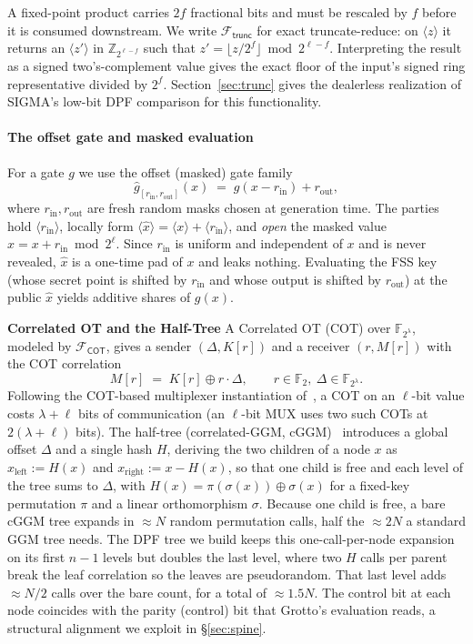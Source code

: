 \documentclass[journal]{IEEEtran}
\theoremstyle{definition}
\theoremstyle{plain}
\newcommand{\F}{\mathbb{F}}
\newcommand{\ashare}[1]{\langle #1 \rangle}             %
\newcommand{\Fcot}{\mathcal{F}_{\mathsf{COT}}}
\newcommand{\Ftr}{\mathcal{F}_{\mathsf{trunc}}}
\newcommand{\xhat}{\hat{x}}
\begin{document}
A fixed-point product carries $2f$ fractional bits and must be rescaled by $f$
before it is consumed downstream. We write $\Ftr$ for exact truncate-reduce:
on $\ashare{z}$ it returns an $\ashare{z'}$ in
$\mathbb Z_{2^{\ell-f}}$ such that
$z'=\lfloor z/2^f\rfloor\bmod 2^{\ell-f}$. Interpreting the result as a signed
two's-complement value gives the exact floor of the input's signed ring
representative divided by $2^f$. Section~\ref{sec:trunc} gives the dealerless
realization of SIGMA's low-bit DPF comparison for this functionality.

\paragraph*{The offset gate and masked evaluation}
\label{sec:offset}
For a gate $g$ we use the offset (masked) gate family
\begin{equation}
\hat g_{[r_{\mathrm{in}},r_{\mathrm{out}}]}(x) \;=\; g\!\left(x - r_{\mathrm{in}}\right) + r_{\mathrm{out}},
\label{eq:offset}
\end{equation}
where $r_{\mathrm{in}},r_{\mathrm{out}}$ are fresh random masks chosen at
generation time. The parties hold $\ashare{r_{\mathrm{in}}}$, locally form
$\ashare{\xhat}=\ashare{x}+\ashare{r_{\mathrm{in}}}$, and \emph{open} the masked
value $\xhat=x+r_{\mathrm{in}}\bmod 2^{\ell}$. Since $r_{\mathrm{in}}$ is uniform
and independent of $x$ and is never revealed, $\xhat$ is a one-time pad of $x$
and leaks nothing. Evaluating the FSS key (whose secret point is shifted by
$r_{\mathrm{in}}$ and whose output is shifted by $r_{\mathrm{out}}$) at the public
$\xhat$ yields additive shares of $g(x)$.


\textbf{Correlated OT and the Half-Tree}
\label{sec:cot}
A Correlated OT (COT) over $\F_{2^{\lambda}}$, modeled by $\Fcot$, gives a sender
$(\Delta, K[r])$ and a receiver $(r, M[r])$ with the COT correlation
\begin{equation}
M[r] \;=\; K[r]\oplus r\cdot\Delta, \qquad r\in\F_2,\ \Delta\in\F_{2^{\lambda}}.
\label{eq:cot}
\end{equation}
Following the COT-based multiplexer instantiation of~\cite{distfss}, a COT on an
$\ell$-bit value costs $\lambda{+}\ell$ bits of communication (an $\ell$-bit MUX
uses two such COTs at $2(\lambda{+}\ell)$ bits).
The half-tree (correlated-GGM, cGGM)~\cite{halftree} introduces a global offset
$\Delta$ and a single hash $H$, deriving the two children of a node $x$ as
$x_{\mathrm{left}}:=H(x)$ and $x_{\mathrm{right}}:=x-H(x)$, so that one child is
free and each level of the tree sums to $\Delta$, with
$H(x)=\pi(\sigma(x))\oplus\sigma(x)$ for a fixed-key permutation $\pi$ and a
linear orthomorphism $\sigma$. Because one child is free, a bare cGGM tree expands
in $\approx N$ random permutation calls, half the $\approx 2N$ a standard GGM tree
needs. The DPF tree we build keeps this one-call-per-node expansion on its first
$n-1$ levels but doubles the last level, where two $H$ calls per parent break the
leaf correlation so the leaves are pseudorandom. That last level adds $\approx N/2$
calls over the bare count, for a total of $\approx 1.5N$. The control bit at each
node coincides with the parity (control) bit that Grotto's evaluation reads, a
structural alignment we exploit in \S\ref{sec:spine}.
\end{document}
